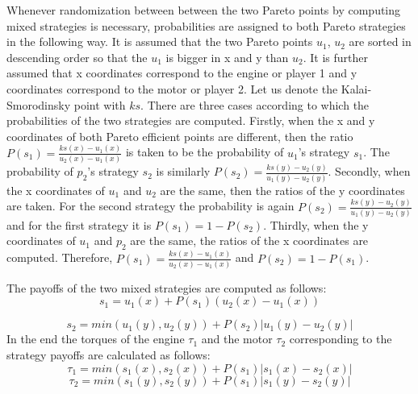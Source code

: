 Whenever randomization between between the two Pareto points by computing mixed strategies is necessary, probabilities are assigned to both Pareto strategies in the following way. It is assumed that the two Pareto points $u_1$, $u_2$ are sorted in descending order so that the $u_1$ is bigger in x and y than $u_2$. It is further assumed that x coordinates correspond to the engine or player 1 and y coordinates correspond to the motor or player 2. Let us denote the Kalai-Smorodinsky point with $ks$. There are three cases according to which the probabilities of the two strategies are computed. Firstly, when the x and y coordinates of both Pareto efficient points are different, then the ratio $P(s_1) = \frac{ks(x) - u_1(x)}{u_2(x) - u_1(x)}$ is taken to be the probability of $u_1$'s strategy $s_1$. The probability of $p_2$'s strategy $s_2$ is similarly $P(s_2) = \frac{ks(y) - u_2(y)}{u_1(y) - u_2(y)}$. Secondly, when the x coordinates of $u_1$ and $u_2$ are the same, then the ratios of the y coordinates are taken. For the second strategy the probability is again $P(s_2) = \frac{ks(y) - u_2(y)}{u_1(y) - u_2(y)}$ and for the first strategy it is $P(s_1) = 1 - P(s_2)$. Thirdly, when the y coordinates of $u_1$ and $p_2$ are the same, the ratios of the x coordinates are computed. Therefore, $P(s_1) =  \frac{ks(x) - u_1(x)}{u_2(x) - u_1(x)}$ and $P(s_2) = 1 - P(s_1)$.

The payoffs of the two mixed strategies are computed as follows:
\begin{equation}
s_1 = u_1(x) + P(s_1)(u_2(x) - u_1(x))
\end{equation} 

\begin{equation}
s_2 = min(u_1(y), u_2(y)) + P(s_2)|u_1(y) - u_2(y)|
\end{equation}
In the end the torques of the engine $\tau_1$ and the motor $\tau_2$ corresponding to the strategy payoffs are calculated as follows:
\begin{equation}
\tau_1 = min(s_1(x), s_2(x)) + P(s_1)|s_1(x) - s_2(x)|
\end{equation}
\begin{equation}
\tau_2 = min(s_1(y), s_2(y)) + P(s_1)|s_1(y) - s_2(y)|
\end{equation}

